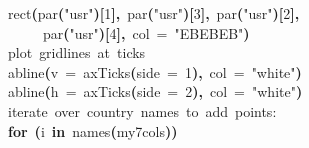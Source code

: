 \documentclass[a4paper]{article}
\newcommand{\hlnumber}[1]{\textcolor[rgb]{0.0823529411764706,0.0784313725490196,0.709803921568627}{#1}}%
\newcommand{\hlfunctioncall}[1]{\textcolor[rgb]{1,0,0}{#1}}%
\newcommand{\hlstring}[1]{\textcolor[rgb]{0.6,0.6,1}{#1}}%
\newcommand{\hlkeyword}[1]{\textcolor[rgb]{0,0,0}{\textbf{#1}}}%
\newcommand{\hlargument}[1]{\textcolor[rgb]{0.694117647058824,0.247058823529412,0.0196078431372549}{#1}}%
\newcommand{\hlcomment}[1]{\textcolor[rgb]{0.8,0.8,0.8}{#1}}%
\newcommand{\hlsymbol}[1]{\textcolor[rgb]{0,0,0}{#1}}%
\newcommand{\hlprompt}[1]{\textcolor[rgb]{0,0,0}{#1}}%
\newcommand{\hlstd}[1]{\textcolor[rgb]{0,0,0}{#1}}%
\newenvironment{Houtput}{\raggedright}{%
%
}
\begin{document}
\begin{Houtput}
\hlstd{}\ttfamily\noindent
\hlprompt{\usebox{\hlnormalsizeboxgreaterthan}{\ }}\hlfunctioncall{rect}\hlkeyword{(}\hlfunctioncall{par}\hlkeyword{(}\hlstring{"usr"}\hlkeyword{)}\hlkeyword{[}\hlnumber{1}\hlkeyword{]}\hlkeyword{,}{\ }\hlfunctioncall{par}\hlkeyword{(}\hlstring{"usr"}\hlkeyword{)}\hlkeyword{[}\hlnumber{3}\hlkeyword{]}\hlkeyword{,}{\ }\hlfunctioncall{par}\hlkeyword{(}\hlstring{"usr"}\hlkeyword{)}\hlkeyword{[}\hlnumber{2}\hlkeyword{]}\hlkeyword{,}\hspace*{\fill}\\
\hlstd{}\hlprompt{{\ }}{\ }{\ }{\ }{\ }\hlfunctioncall{par}\hlkeyword{(}\hlstring{"usr"}\hlkeyword{)}\hlkeyword{[}\hlnumber{4}\hlkeyword{]}\hlkeyword{,}{\ }\hlargument{col}{\ }\hlargument{=}{\ }\hlstring{"\usebox{\hlnormalsizeboxhash}EBEBEB"}\hlkeyword{)}\mbox{}
\normalfont
\hspace*{\fill}\\
\hlstd{}\ttfamily\noindent
\hlprompt{\usebox{\hlnormalsizeboxgreaterthan}{\ }}\hlcomment{\usebox{\hlnormalsizeboxhash}{\ }plot{\ }gridlines{\ }at{\ }ticks}\mbox{}
\normalfont
\hspace*{\fill}\\
\hlstd{}\ttfamily\noindent
\hlprompt{\usebox{\hlnormalsizeboxgreaterthan}{\ }}\hlfunctioncall{abline}\hlkeyword{(}\hlargument{v}{\ }\hlargument{=}{\ }\hlfunctioncall{axTicks}\hlkeyword{(}\hlargument{side}{\ }\hlargument{=}{\ }\hlnumber{1}\hlkeyword{)}\hlkeyword{,}{\ }\hlargument{col}{\ }\hlargument{=}{\ }\hlstring{"white"}\hlkeyword{)}\mbox{}
\normalfont
\hspace*{\fill}\\
\hlstd{}\ttfamily\noindent
\hlprompt{\usebox{\hlnormalsizeboxgreaterthan}{\ }}\hlfunctioncall{abline}\hlkeyword{(}\hlargument{h}{\ }\hlargument{=}{\ }\hlfunctioncall{axTicks}\hlkeyword{(}\hlargument{side}{\ }\hlargument{=}{\ }\hlnumber{2}\hlkeyword{)}\hlkeyword{,}{\ }\hlargument{col}{\ }\hlargument{=}{\ }\hlstring{"white"}\hlkeyword{)}\mbox{}
\normalfont
\hspace*{\fill}\\
\hlstd{}\ttfamily\noindent
\hlprompt{\usebox{\hlnormalsizeboxgreaterthan}{\ }}\hlcomment{\usebox{\hlnormalsizeboxhash}{\ }iterate{\ }over{\ }country{\ }names{\ }to{\ }add{\ }points:}\mbox{}
\normalfont
\hspace*{\fill}\\
\hlstd{}\ttfamily\noindent
\hlprompt{\usebox{\hlnormalsizeboxgreaterthan}{\ }}\hlkeyword{for}{\ }\hlkeyword{(}\hlsymbol{i}{\ }\hlkeyword{in}{\ }\hlfunctioncall{names}\hlkeyword{(}\hlsymbol{my7cols}\hlkeyword{)}\hlkeyword{)}{\ }\hlkeyword{\usebox{\hlnormalsizeboxopenbrace}}\hspace*{\fill}\\

\end{Houtput}
\end{document}
